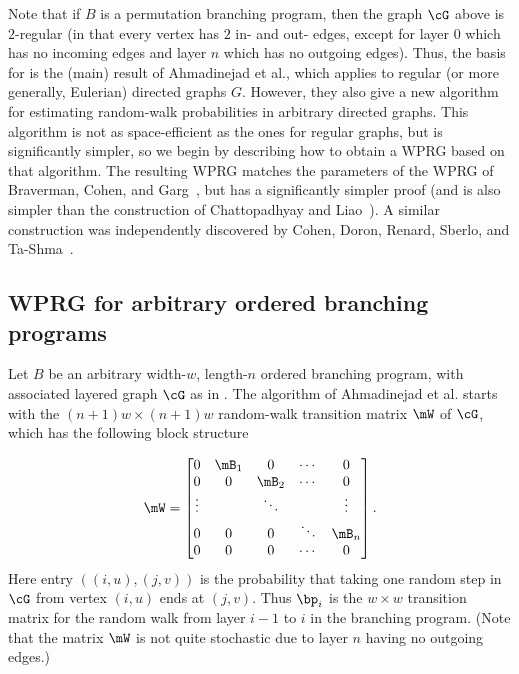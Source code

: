 \documentclass{toc}
\begin{document}
    Note that if $B$ is a permutation branching program, then the graph $\cG$ above is $2$-regular (in that every vertex has $2$ in- and out- edges, except for layer $0$ which has no incoming edges and layer $n$ which has no outgoing edges).  Thus, the basis for  is the (main) result 
    of %
Ahmadinejad  %
et al., which applies to regular (or more generally, Eulerian) directed graphs $G$.
    However, they also give a new algorithm for estimating random-walk probabilities in arbitrary directed graphs.  This
    algorithm is not as space-efficient as the ones for regular graphs, but is significantly simpler, so we begin by describing how to
    obtain a WPRG based on that algorithm.  The resulting WPRG matches the parameters of the WPRG of Braverman, Cohen, and Garg~\cite{BravermanCoGa18}, but has a significantly simpler proof (and is also simpler than the construction of %
     Chattopadhyay %
     and Liao~\cite{ChattopadhyayLi20}). A similar construction was independently discovered by Cohen, Doron, Renard, Sberlo, and Ta-Shma~\cite{CohenDoReSbTa21}.
    
    \subsection{WPRG for arbitrary ordered branching programs}\label{subsec:OBP_overview}
    Let $B$ be an arbitrary width-$w$, length-$n$ ordered branching program, with associated layered graph $\cG$ as in .  The algorithm of
%
Ahmadinejad  %
et al. starts with the $(n+1)w\times (n+1)w$
%
random-walk transition matrix $\mW$ of $\cG$, which has the following block structure %

    $$\mW=
    \begin{bmatrix}
    0 & \mB_1 & 0 & \cdots & 0 \\
    0 & 0 & \mB_2 & \cdots & 0 \\
    \vdots & & \ddots & & \vdots\\
    0 & 0 & 0 & \ddots & \mB_n\\
    0 & 0 & 0 & \cdots &  0 \\
    \end{bmatrix}.$$ %
    Here entry $((i,u),(j,v))$ is the probability that taking one random step in $\cG$ from vertex $(i,u)$ ends at $(j,v)$.  Thus $\bp_i$ is the $w\times w$ transition matrix for the random walk from layer $i-1$ to $i$ in the branching program.
   (Note that the matrix $\mW$ is not quite stochastic due to layer $n$ having no
   outgoing edges.)
   
\end{document}
